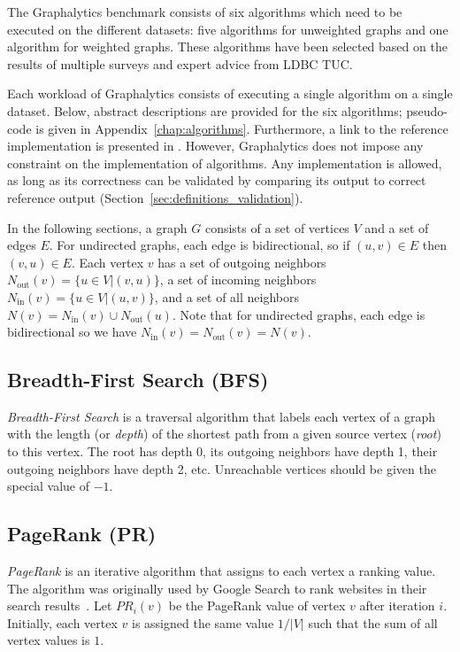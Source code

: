 The Graphalytics benchmark consists of six algorithms which need to be executed on the different datasets: five algorithms for unweighted graphs and one algorithm for weighted graphs. These algorithms have been selected based on the results of multiple surveys and expert advice from LDBC TUC.

Each workload of Graphalytics consists of executing a single algorithm on a single dataset. Below, abstract descriptions are provided for the six algorithms; pseudo-code is given in Appendix~\ref{chap:algorithms}. Furthermore, a link to the reference implementation is presented in . However, Graphalytics does not impose any constraint on the implementation of algorithms. Any implementation is allowed, as long as its correctness can be validated by comparing its output to correct reference output (Section~\ref{sec:definitions_validation}). 

In the following sections, a graph $G$ consists of a set of vertices $V$ and a set of edges $E$. For undirected graphs, each edge is bidirectional, so if $(u,v)\in E$ then $(v,u)\in E$. Each vertex $v$ has a set of outgoing neighbors
$N_\mathrm{out}(v) = \{u \in V | (v, u) \}$, a set of incoming neighbors
$N_\mathrm{in}(v)  = \{u \in V | (u, v) \}$, and a set of all neighbors
$N(v) = N_\mathrm{in}(v) \cup N_\mathrm{out}(u)$.
Note that for undirected graphs, each edge is bidirectional so we have $N_\mathrm{in}(v) = N_\mathrm{out}(v) = N(v)$.


\subsection{Breadth-First Search (BFS)}
\emph{Breadth-First Search} is a traversal algorithm that labels each vertex of a graph with the length (or \emph{depth}) of the shortest path from a given source vertex (\emph{root}) to this vertex. The root has depth 0, its outgoing neighbors have depth 1, their outgoing neighbors have depth 2, etc. Unreachable vertices should be given the special value of $-1$.


\subsection{PageRank (PR)}
\emph{PageRank} is an iterative algorithm that assigns to each vertex a ranking value. The algorithm was originally used by Google Search to rank websites in their search results~\cite{page1999pagerank}. Let $PR_i(v)$ be the PageRank value of vertex $v$ after iteration $i$. Initially, each vertex $v$ is assigned the same value $1/|V|$ such that the sum of all vertex values is $1$.

